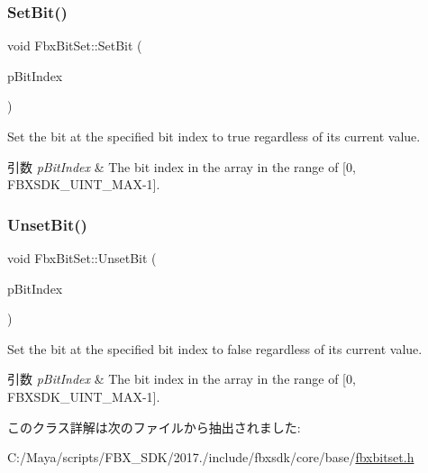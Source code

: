 \subsubsection{\texorpdfstring{Set\+Bit()}{SetBit()}}
{\footnotesize\ttfamily void Fbx\+Bit\+Set\+::\+Set\+Bit (\begin{DoxyParamCaption}\item[{const \hyperlink{fbxtypes_8h_ae9fb141d8158a730aa85ec5ff2ea3f6b}{Fbx\+U\+Int}}]{p\+Bit\+Index }\end{DoxyParamCaption})}

Set the bit at the specified bit index to true regardless of its current value. 
\begin{DoxyParams}{引数}
{\em p\+Bit\+Index} & The bit index in the array in the range of \mbox{[}0, F\+B\+X\+S\+D\+K\+\_\+\+U\+I\+N\+T\+\_\+\+M\+A\+X-\/1\mbox{]}. \\
\hline
\end{DoxyParams}
\mbox{\label{class_fbx_bit_set_ade99ba2a4fc49743b4d2e2037a5d4e28}} 
\subsubsection{\texorpdfstring{Unset\+Bit()}{UnsetBit()}}
{\footnotesize\ttfamily void Fbx\+Bit\+Set\+::\+Unset\+Bit (\begin{DoxyParamCaption}\item[{const \hyperlink{fbxtypes_8h_ae9fb141d8158a730aa85ec5ff2ea3f6b}{Fbx\+U\+Int}}]{p\+Bit\+Index }\end{DoxyParamCaption})}

Set the bit at the specified bit index to false regardless of its current value. 
\begin{DoxyParams}{引数}
{\em p\+Bit\+Index} & The bit index in the array in the range of \mbox{[}0, F\+B\+X\+S\+D\+K\+\_\+\+U\+I\+N\+T\+\_\+\+M\+A\+X-\/1\mbox{]}. \\
\hline
\end{DoxyParams}


このクラス詳解は次のファイルから抽出されました\+:\begin{DoxyCompactItemize}
\item 
C\+:/\+Maya/scripts/\+F\+B\+X\+\_\+\+S\+D\+K/2017./include/fbxsdk/core/base/\hyperlink{fbxbitset_8h}{fbxbitset.\+h}\end{DoxyCompactItemize}
